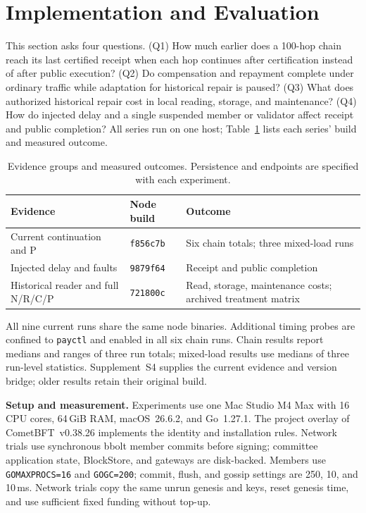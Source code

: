 \section{Implementation and Evaluation}
\label{sec:evaluation}

This section asks four questions. (Q1) How much earlier does a 100-hop
chain reach its last certified receipt when each hop continues after
certification instead of after public execution? (Q2) Do compensation and
repayment complete under ordinary traffic while adaptation for historical
repair is paused? (Q3) What does authorized historical repair cost in local
reading, storage, and maintenance? (Q4) How do injected delay and a single
suspended member or validator affect receipt and public completion? All
series run on one host; Table~\ref{tab:eval-builds} lists each series' build and measured outcome.

\begin{table}[!t]
\caption{Evidence groups and measured outcomes. Persistence and endpoints are specified with each experiment.}
\label{tab:eval-builds}
\centering\small
\setlength{\tabcolsep}{3pt}
\begin{tabular}{@{}p{}p{}p{}@{}}
\toprule
Evidence & Node build & Outcome \\
\midrule
Current continuation and P & \texttt{f856c7b} & Six chain totals; three mixed-load runs \\
Injected delay and faults & \texttt{9879f64} & Receipt and public completion \\
Historical reader and full N/R/C/P & \texttt{721800c} & Read, storage, maintenance costs; archived treatment matrix \\
\bottomrule
\end{tabular}
\end{table}

All nine current runs share the same node binaries. Additional timing probes are confined to \texttt{payctl} and enabled in all six chain runs. Chain results report medians and ranges of three run totals; mixed-load results use medians of three run-level statistics. Supplement~S4 supplies the current evidence and version bridge; older results retain their original build.

\noindent\textbf{Setup and measurement.}
Experiments use one Mac Studio M4 Max with 16 CPU cores, 64\,GiB RAM,
macOS~26.6.2, and Go~1.27.1. The project overlay of CometBFT~v0.38.26
implements the identity and installation rules. Network trials use
synchronous bbolt member commits before signing; committee application
state, BlockStore, and gateways are disk-backed. Members use
\texttt{GOMAXPROCS=16} and \texttt{GOGC=200}; commit, flush, and gossip
settings are 250, 10, and 10\,ms. Network trials copy the same unrun genesis and keys, reset genesis time,
and use sufficient fixed funding without top-up.

